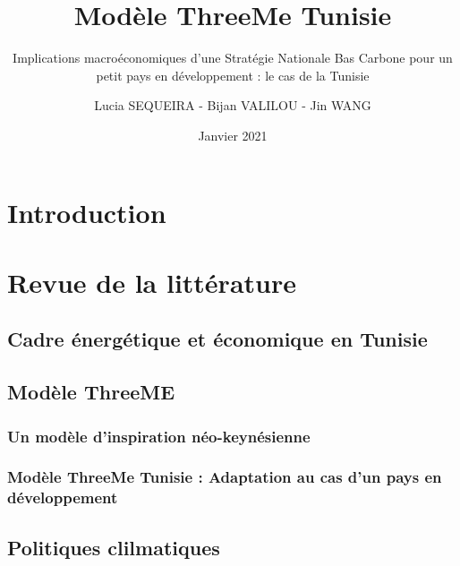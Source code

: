 \documentclass[
]{article}
\title{Modèle ThreeMe Tunisie}
\subtitle{Implications macroéconomiques d'une Stratégie Nationale Bas
Carbone pour un petit pays en développement : le cas de la Tunisie}
\author{Lucia SEQUEIRA - Bijan VALILOU - Jin WANG}
\date{Janvier 2021}
\begin{document}
\maketitle

{
\setcounter{tocdepth}{2}
\tableofcontents
}
\newpage

\hypertarget{introduction}{%
\section{Introduction}\label{introduction}}

\hypertarget{revue-de-la-littuxe9rature}{%
\section{Revue de la littérature}\label{revue-de-la-littuxe9rature}}

\hypertarget{cadre-uxe9nerguxe9tique-et-uxe9conomique-en-tunisie}{%
\subsection{Cadre énergétique et économique en
Tunisie}\label{cadre-uxe9nerguxe9tique-et-uxe9conomique-en-tunisie}}

\hypertarget{moduxe8le-threeme}{%
\subsection{Modèle ThreeME}\label{moduxe8le-threeme}}

\hypertarget{un-moduxe8le-dinspiration-nuxe9o-keynuxe9sienne}{%
\subsubsection{Un modèle d'inspiration
néo-keynésienne}\label{un-moduxe8le-dinspiration-nuxe9o-keynuxe9sienne}}

\hypertarget{moduxe8le-threeme-tunisie-adaptation-au-cas-dun-pays-en-duxe9veloppement}{%
\subsubsection{Modèle ThreeMe Tunisie : Adaptation au cas d'un pays en
développement}\label{moduxe8le-threeme-tunisie-adaptation-au-cas-dun-pays-en-duxe9veloppement}}

\hypertarget{politiques-clilmatiques}{%
\subsection{Politiques clilmatiques}\label{politiques-clilmatiques}}
\end{document}
